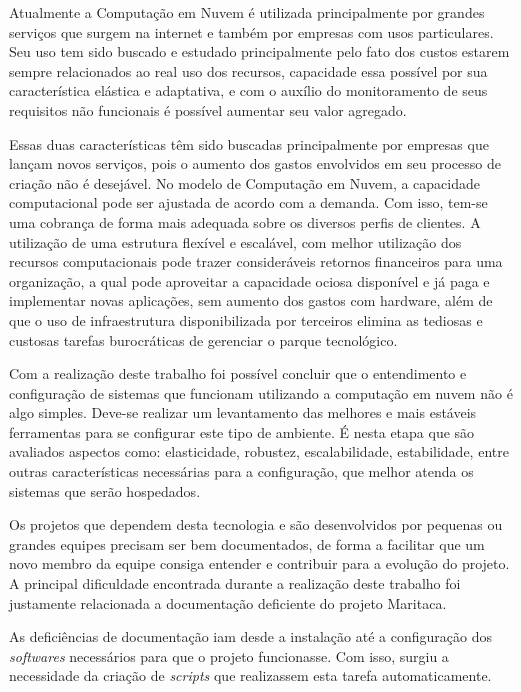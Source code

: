 Atualmente a Computação em Nuvem é utilizada principalmente por grandes serviços que surgem na internet e também por empresas
com usos particulares. Seu uso tem sido buscado e estudado principalmente pelo fato dos custos estarem sempre relacionados ao real uso dos recursos, capacidade essa possível por
sua característica elástica e adaptativa, e com o auxílio do monitoramento de seus requisitos não funcionais é possível aumentar seu valor agregado.

Essas duas características têm sido buscadas principalmente por empresas que lançam novos serviços, pois o aumento dos gastos envolvidos em seu processo de criação não é desejável. No modelo de Computação em Nuvem, a capacidade computacional pode ser ajustada de acordo com a demanda. Com isso, tem-se uma cobrança de forma mais adequada sobre os diversos perfis de clientes. A utilização de uma estrutura flexível e escalável, com melhor utilização dos recursos computacionais pode trazer consideráveis retornos financeiros para uma organização, a qual pode aproveitar a capacidade ociosa disponível e já paga e implementar novas aplicações, sem aumento dos gastos com hardware, além de que o uso de infraestrutura disponibilizada por terceiros elimina as tediosas e custosas tarefas burocráticas de gerenciar o parque tecnológico.

Com a realização deste trabalho foi possível concluir que o entendimento e configuração de sistemas que funcionam utilizando a computação em nuvem não é algo simples. Deve-se realizar um levantamento das melhores e mais estáveis ferramentas para se configurar este tipo de ambiente. É nesta etapa que são avaliados aspectos como: elasticidade, robustez, escalabilidade, estabilidade, entre outras características necessárias para a configuração, que melhor atenda os sistemas que serão hospedados.


Os projetos que dependem desta tecnologia e são desenvolvidos por pequenas ou grandes equipes precisam ser bem documentados, de forma a facilitar que um novo membro da equipe consiga entender e contribuir para a evolução do projeto. A principal dificuldade encontrada durante a realização deste trabalho foi justamente relacionada a documentação deficiente do projeto Maritaca.

As deficiências de documentação iam desde a instalação até a configuração dos \textit{softwares} necessários para que o projeto funcionasse. Com isso, surgiu a necessidade da criação de \textit{scripts} que realizassem esta tarefa automaticamente.

